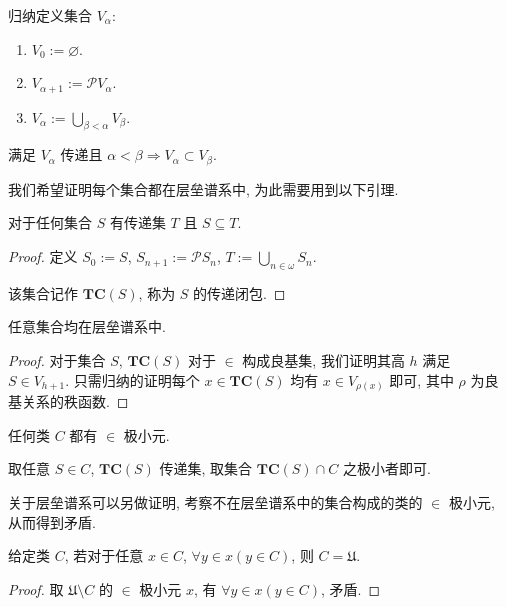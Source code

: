 \begin{definition}
    归纳定义集合 \(V_\alpha\):

    \begin{enumerate}
        \item \(V_0 := \varnothing\).
        \item \(V_{\alpha + 1} := \mathcal{P} V_\alpha\).
        \item \(V_\alpha := \bigcup_{\beta < \alpha} V_\beta\).
    \end{enumerate}

    满足 \(V_\alpha\) 传递且 \(\alpha < \beta \Rightarrow V_\alpha \subset V_\beta\).
\end{definition}

我们希望证明每个集合都在层垒谱系中, 为此需要用到以下引理.

\begin{lemma}
    对于任何集合 \(S\) 有传递集 \(T\) 且 \(S \subseteq T\).

    \begin{proof}
        定义 \(S_0 := S\), \(S_{n + 1} := \mathcal{P} S_n\), \(T := \bigcup_{n \in \omega} S_n\).

        该集合记作 \(\mathbf{TC}(S)\), 称为 \(S\) 的传递闭包.
    \end{proof}
\end{lemma}

\begin{lemma}
    任意集合均在层垒谱系中.

    \begin{proof}
        对于集合 \(S\), \(\mathbf{TC}(S)\) 对于 \(\in\) 构成良基集, 我们证明其高 \(h\) 满足 \(S \in V_{h + 1}\).
        只需归纳的证明每个 \(x \in \mathbf{TC}(S)\) 均有 \(x \in V_{\rho (x)}\) 即可, 其中 \(\rho\) 为良基关系的秩函数.
    \end{proof}
\end{lemma}

\begin{lemma}
    任何类 \(C\) 都有 \(\in\) 极小元.

    取任意 \(S \in C\), \(\mathbf{TC}(S)\) 传递集, 取集合 \(\mathbf{TC}(S) \cap C\) 之极小者即可.
\end{lemma}

关于层垒谱系可以另做证明, 考察不在层垒谱系中的集合构成的类的 \(\in\) 极小元, 从而得到矛盾.

\begin{theorem*}[\(\in\) 归纳]
    \label {theorem:in's induction}
    给定类 \(C\), 若对于任意 \(x \in C\), \(\forall y \in x (y \in C)\), 则 \(C = \mathfrak{U}\).

    \begin{proof}
        取 \(\mathfrak{U} \setminus C\) 的 \(\in\) 极小元 \(x\), 有 \(\forall y \in x (y \in C)\), 矛盾.
    \end{proof}
\end{theorem*}

